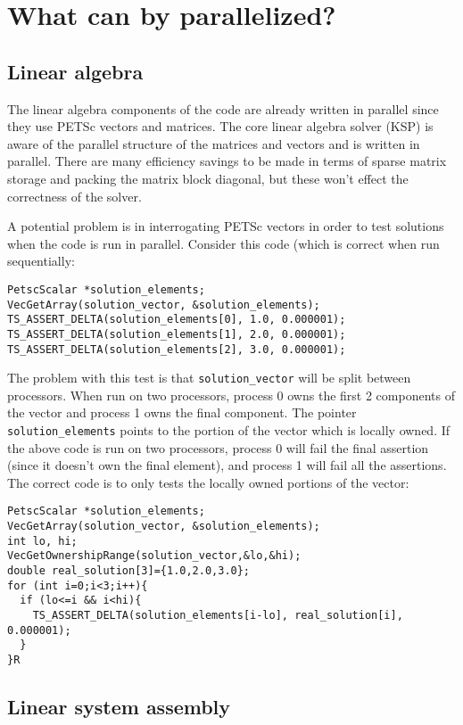 \documentclass{article}
\begin{document}
\section{What can by parallelized?}

\subsection{Linear algebra}

The linear algebra components of the code are already written in
parallel since they use PETSc vectors and matrices.  The core linear
algebra solver (KSP) is aware of the parallel structure of the
matrices and vectors and is written in parallel.  There are many
efficiency savings to be made in terms of sparse matrix storage and
packing the matrix block diagonal, but these won't effect the
correctness of the solver.

A potential problem is in interrogating PETSc vectors in order to test
solutions when the code is run in parallel.  Consider this code (which
is correct when run sequentially:
\begin{verbatim}
PetscScalar *solution_elements;
VecGetArray(solution_vector, &solution_elements);
TS_ASSERT_DELTA(solution_elements[0], 1.0, 0.000001);
TS_ASSERT_DELTA(solution_elements[1], 2.0, 0.000001);
TS_ASSERT_DELTA(solution_elements[2], 3.0, 0.000001);
\end{verbatim}

The problem with this test is that {\tt solution\_vector} will be split
between processors.  When run on two processors, process 0 owns the
first 2 components of the vector and process 1 owns the final
component.  The pointer {\tt solution\_elements} points to the portion
of the vector which is locally owned.  If the above code is run on two
processors, process 0 will fail the final assertion (since it doesn't
own the final element), and process 1 will fail all the assertions.
The correct code is to only tests the locally owned portions of the vector:
\begin{verbatim}
PetscScalar *solution_elements;
VecGetArray(solution_vector, &solution_elements);
int lo, hi;
VecGetOwnershipRange(solution_vector,&lo,&hi);
double real_solution[3]={1.0,2.0,3.0};
for (int i=0;i<3;i++){
  if (lo<=i && i<hi){
    TS_ASSERT_DELTA(solution_elements[i-lo], real_solution[i], 0.000001);
  }
}R
\end{verbatim}

\subsection{Linear system assembly}
\end{document}
